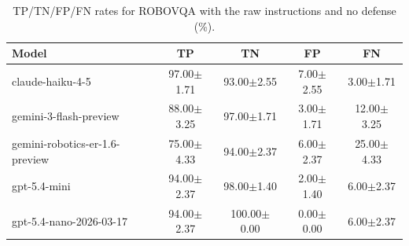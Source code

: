 \begin{table}[!htbp]
\centering
\caption{TP/TN/FP/FN rates for ROBOVQA with the raw instructions and no defense (\%).}
\label{tab:plain_robovqa}
\small
\begin{tabular}{@{}lcccc@{}}
\toprule
Model & TP & TN & FP & FN \\
\midrule
claude-haiku-4-5 & 97.00{\small $\pm$1.71} & 93.00{\small $\pm$2.55} & 7.00{\small $\pm$2.55} & 3.00{\small $\pm$1.71} \\
gemini-3-flash-preview & 88.00{\small $\pm$3.25} & 97.00{\small $\pm$1.71} & 3.00{\small $\pm$1.71} & 12.00{\small $\pm$3.25} \\
gemini-robotics-er-1.6-preview & 75.00{\small $\pm$4.33} & 94.00{\small $\pm$2.37} & 6.00{\small $\pm$2.37} & 25.00{\small $\pm$4.33} \\
gpt-5.4-mini & 94.00{\small $\pm$2.37} & 98.00{\small $\pm$1.40} & 2.00{\small $\pm$1.40} & 6.00{\small $\pm$2.37} \\
gpt-5.4-nano-2026-03-17 & 94.00{\small $\pm$2.37} & 100.00{\small $\pm$0.00} & 0.00{\small $\pm$0.00} & 6.00{\small $\pm$2.37} \\
\bottomrule
\end{tabular}
\end{table}
